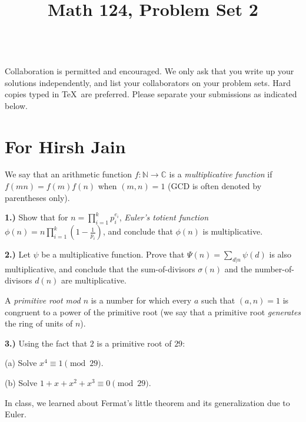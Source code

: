 \documentclass[10pt]{amsart}
\title{Math 124, Problem Set 2}
\begin{document}
\maketitle

\\
 Collaboration is permitted and encouraged. We only ask that you write up your solutions independently, and list your collaborators on your problem sets. Hard copies typed in \TeX\  are preferred. Please separate your submissions as indicated below.

\section*{For Hirsh Jain}

\noindent We say that an arithmetic function $f: \mathbb{N} \to \mathbb{C}$ is a \emph{multiplicative function} if $f(mn) = f(m) f(n)$ when $(m,n) = 1$ (GCD is often denoted by parentheses only).

\medskip

{\bf 1.)} Show that for $n = \prod_{i=1}^k p_i^{e_i}$, \emph{Euler's totient function} $\phi(n) = n \prod_{i=1}^{k} \left(1 - \frac{1}{p_i}\right)$, and conclude that $\phi(n)$ is multiplicative.

\medskip

{\bf 2.)} Let $\psi$ be a multiplicative function. Prove that $\Psi(n) = \sum_{d|n} \psi(d)$ is also multiplicative, and conclude that  the sum-of-divisors $\sigma(n)$ and the number-of-divisors $d(n)$ are multiplicative.

\medskip

\noindent A \emph{primitive root mod $n$} is a number for which every $a$ such that $(a, n) = 1$ is congruent to a power of the primitive root (we say that a primitive root \emph{generates} the ring of units of $n$).

\medskip

{\bf 3.)} Using the fact that $2$ is a primitive root of $29$:

\smallskip

(a) Solve $x^4 \equiv 1 \pmod{29}$.

\smallskip

(b) Solve $1 + x + x^2 + x^3 \equiv 0 \pmod{29}$.

\medskip

\noindent In class, we learned about Fermat's little theorem and its generalization due to Euler.
\end{document}
